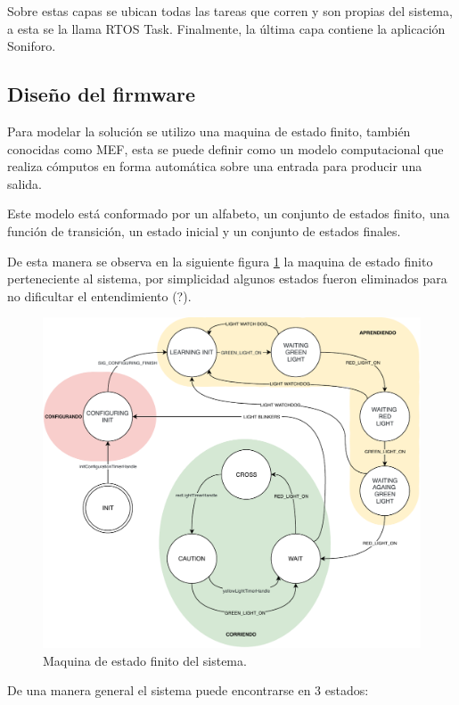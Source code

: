 Sobre estas capas se ubican todas las tareas que corren y son propias del sistema, a esta se la llama RTOS Task. Finalmente, la última capa contiene la aplicación Soniforo.

\subsection{Diseño del firmware}
Para modelar la solución se utilizo una maquina de estado finito, también conocidas como MEF, esta se puede definir como un modelo computacional que realiza cómputos en forma automática sobre una entrada para producir una salida.

Este modelo está conformado por un alfabeto, un conjunto de estados finito, una función de transición, un estado inicial y un conjunto de estados finales.

De esta manera se observa en la siguiente figura \ref{fig:maquinaEstadoFinitoSoniforo}  la maquina de estado finito perteneciente al sistema, por simplicidad algunos estados fueron eliminados para no dificultar el entendimiento (?).

\begin{figure}[h]
	\centering
	\includegraphics[scale=.7]{./Figures/maquinaEstadoFinitoSoniforo.pdf}
	\caption{Maquina de estado finito del sistema.}
	\label{fig:maquinaEstadoFinitoSoniforo}
\end{figure}

De una manera general el sistema puede encontrarse en 3 estados:


